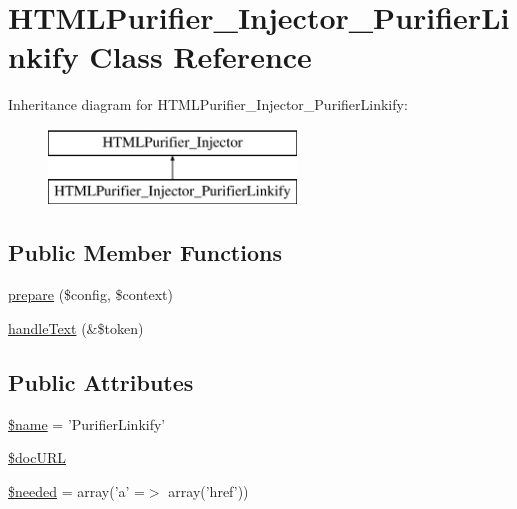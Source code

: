 \hypertarget{classHTMLPurifier__Injector__PurifierLinkify}{\section{H\+T\+M\+L\+Purifier\+\_\+\+Injector\+\_\+\+Purifier\+Linkify Class Reference}
\label{classHTMLPurifier__Injector__PurifierLinkify}
}
Inheritance diagram for H\+T\+M\+L\+Purifier\+\_\+\+Injector\+\_\+\+Purifier\+Linkify\+:\begin{figure}[H]
\begin{center}
\leavevmode
\includegraphics[height=2.000000cm]{classHTMLPurifier__Injector__PurifierLinkify}
\end{center}
\end{figure}
\subsection*{Public Member Functions}
\begin{DoxyCompactItemize}
\item 
\hyperlink{classHTMLPurifier__Injector__PurifierLinkify_aaec4cbaf383520efa079f271f1f45bab}{prepare} (\$config, \$context)
\item 
\hyperlink{classHTMLPurifier__Injector__PurifierLinkify_abb9100002cf8d6c1f386c1e8f9c84854}{handle\+Text} (\&\$token)
\end{DoxyCompactItemize}
\subsection*{Public Attributes}
\begin{DoxyCompactItemize}
\item 
\hyperlink{classHTMLPurifier__Injector__PurifierLinkify_a52d19cc95bf3f5a4288439ed818e72e1}{\$name} = 'Purifier\+Linkify'
\item 
\hyperlink{classHTMLPurifier__Injector__PurifierLinkify_aec059e9f48b1f2dac2e8ca85ad7644ef}{\$doc\+U\+R\+L}
\item 
\hyperlink{classHTMLPurifier__Injector__PurifierLinkify_a569fa2c54469b9eddc354e7ad0e3d3bb}{\$needed} = array('a' =$>$ array('href'))
\end{DoxyCompactItemize}
